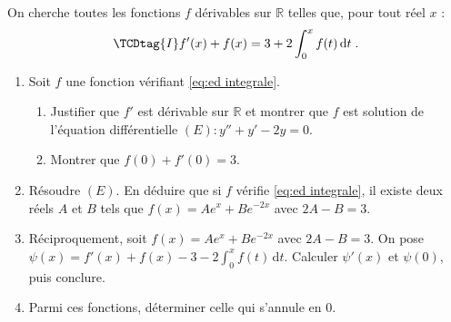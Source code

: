 \begin{exo}
\label{exo:ed equation integrale}
On cherche toutes les fonctions $f$ d\'erivables sur $\mathbb{R}$ telles que, pour tout r\'eel $x$ :
\begin{equation}
\TCDtag{I}
f'(x) + f(x) = 3 + 2 \int_0^x f(t) \, \mathrm{d}t \;.
\label{eq:ed integrale}
\end{equation}
\begin{enumerate}
\item Soit $f$ une fonction v\'erifiant \eqref{eq:ed integrale}.
      \begin{enumerate}
      \item Justifier que $f'$ est d\'erivable sur $\mathbb{R}$ et montrer que $f$ est solution de l'\'equation
            diff\'erentielle $(E) : y'' + y' - 2y = 0$.
      \item Montrer que $f(0) + f'(0) = 3$.
      \end{enumerate}
\item R\'esoudre $(E)$. En d\'eduire que si $f$ v\'erifie \eqref{eq:ed integrale}, il existe deux r\'eels $A$ et $B$
      tels que $f(x) = A e^{x} + B e^{-2x}$ avec $2A - B = 3$.
\item R\'eciproquement, soit $f(x) = A e^{x} + B e^{-2x}$ avec $2A - B = 3$.
      On pose $\psi(x) = f'(x) + f(x) - 3 - 2\int_0^x f(t)\,\mathrm{d}t$.
      Calculer $\psi'(x)$ et $\psi(0)$, puis conclure.
\item Parmi ces fonctions, d\'eterminer celle qui s'annule en $0$.
\end{enumerate}
\end{exo}

